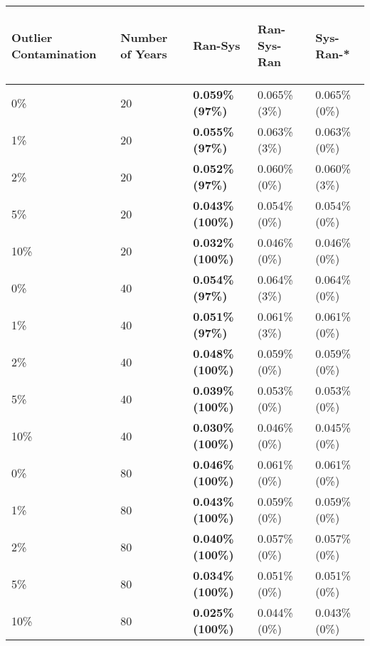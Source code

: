\begin{table}[ht]
\centering
\begin{tabular}{lllll}
  \hline
\begin{sideways} Outlier Contamination \end{sideways} & \begin{sideways} Number of Years \end{sideways} & \begin{sideways} Ran-Sys \end{sideways} & \begin{sideways} Ran-Sys-Ran \end{sideways} & \begin{sideways} Sys-Ran-* \end{sideways} \\ 
  \hline
0\% & 20 & \textbf{0.059\% (97\%)} & 0.065\% (3\%) & 0.065\% (0\%) \\ 
  1\% & 20 & \textbf{0.055\% (97\%)} & 0.063\% (3\%) & 0.063\% (0\%) \\ 
  2\% & 20 & \textbf{0.052\% (97\%)} & 0.060\% (0\%) & 0.060\% (3\%) \\ 
  5\% & 20 & \textbf{0.043\% (100\%)} & 0.054\% (0\%) & 0.054\% (0\%) \\ 
  10\% & 20 & \textbf{0.032\% (100\%)} & 0.046\% (0\%) & 0.046\% (0\%) \\ 
  0\% & 40 & \textbf{0.054\% (97\%)} & 0.064\% (3\%) & 0.064\% (0\%) \\ 
  1\% & 40 & \textbf{0.051\% (97\%)} & 0.061\% (3\%) & 0.061\% (0\%) \\ 
  2\% & 40 & \textbf{0.048\% (100\%)} & 0.059\% (0\%) & 0.059\% (0\%) \\ 
  5\% & 40 & \textbf{0.039\% (100\%)} & 0.053\% (0\%) & 0.053\% (0\%) \\ 
  10\% & 40 & \textbf{0.030\% (100\%)} & 0.046\% (0\%) & 0.045\% (0\%) \\ 
  0\% & 80 & \textbf{0.046\% (100\%)} & 0.061\% (0\%) & 0.061\% (0\%) \\ 
  1\% & 80 & \textbf{0.043\% (100\%)} & 0.059\% (0\%) & 0.059\% (0\%) \\ 
  2\% & 80 & \textbf{0.040\% (100\%)} & 0.057\% (0\%) & 0.057\% (0\%) \\ 
  5\% & 80 & \textbf{0.034\% (100\%)} & 0.051\% (0\%) & 0.051\% (0\%) \\ 
  10\% & 80 & \textbf{0.025\% (100\%)} & 0.044\% (0\%) & 0.043\% (0\%) \\ 
   \hline
\end{tabular}
\end{table}

